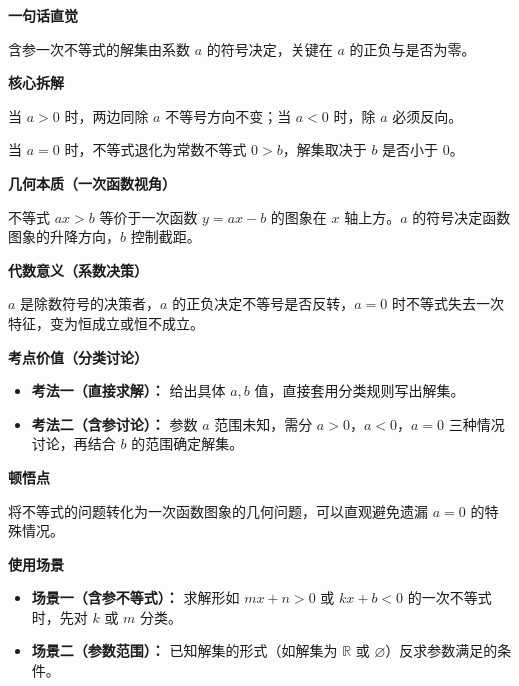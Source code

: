 \begin{explanationbox}

	\textbf{\textcolor{CExplanation}{一句话直觉}}

	含参一次不等式的解集由系数 $a$ 的符号决定，关键在 $a$ 的正负与是否为零。

	\medskip
	\textbf{\textcolor{CExplanation}{核心拆解}}
	\begin{description}[style=nextline, leftmargin=2.8em, labelsep=0.5em, itemsep=0.45em]
		\item[\textbf{要点一（系数符号）：}] 当 $a>0$ 时，两边同除 $a$ 不等号方向不变；当 $a<0$ 时，除 $a$ 必须反向。
		\item[\textbf{要点二（零系退化）：}] 当 $a=0$ 时，不等式退化为常数不等式 $0>b$，解集取决于 $b$ 是否小于 $0$。
	\end{description}

	\medskip
	\textbf{\textcolor{CExplanation}{几何本质（一次函数视角）}}

	不等式 $ax>b$ 等价于一次函数 $y=ax-b$ 的图象在 $x$ 轴上方。$a$ 的符号决定函数图象的升降方向，$b$ 控制截距。

	\medskip
	\textbf{\textcolor{CExplanation}{代数意义（系数决策）}}

	$a$ 是除数符号的决策者，$a$ 的正负决定不等号是否反转，$a=0$ 时不等式失去一次特征，变为恒成立或恒不成立。

	\medskip
	\textbf{\textcolor{CExplanation}{考点价值（分类讨论）}}
	\begin{itemize}[leftmargin=*, itemsep=0.5em, topsep=0.4em]
		\item \textbf{考法一（直接求解）：} 给出具体 $a,b$ 值，直接套用分类规则写出解集。
		\item \textbf{考法二（含参讨论）：} 参数 $a$ 范围未知，需分 $a>0$，$a<0$，$a=0$ 三种情况讨论，再结合 $b$ 的范围确定解集。
	\end{itemize}

	\medskip
	\textbf{\textcolor{CExplanation}{顿悟点}}

	将不等式的问题转化为一次函数图象的几何问题，可以直观避免遗漏 $a=0$ 的特殊情况。

	\medskip
	\textbf{\textcolor{CExplanation}{使用场景}}
	\begin{itemize}[leftmargin=*, itemsep=0.5em, topsep=0.4em]
		\item \textbf{场景一（含参不等式）：} 求解形如 $mx+n>0$ 或 $kx+b<0$ 的一次不等式时，先对 $k$ 或 $m$ 分类。
		\item \textbf{场景二（参数范围）：} 已知解集的形式（如解集为 $\mathbb{R}$ 或 $\varnothing$）反求参数满足的条件。
	\end{itemize}

\end{explanationbox}
